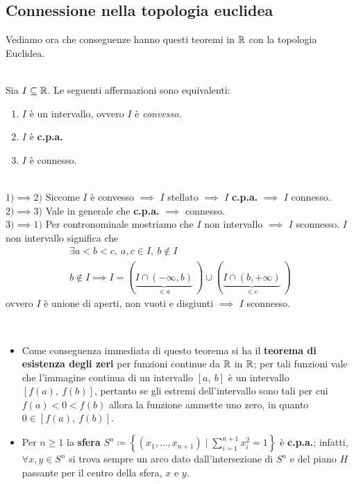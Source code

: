 \subsection{Connessione nella topologia euclidea}
Vediamo ora che conseguenze hanno questi teoremi in $\mathbb{R}$ con la topologia Euclidea.
\begin{theorema}~{}\\
	Sia $I\subseteq \mathbb{R}$. Le seguenti affermazioni sono equivalenti:
		\begin{enumerate}
	\item $I$ è un intervallo, ovvero $I$ è \textit{convesso}.
	\item $I$ è \textbf{c.p.a.}
	\item $I$ è connesso.
		\end{enumerate}
	\vspace{-3mm}
\end{theorema}
\begin{demonstration}~{}\\
	$1) \implies 2)$ Siccome $I$ è convesso $\implies$ $I$ stellato $\implies$ $I$ \textbf{c.p.a.} $\implies$ $I$ connesso. \\
	$2) \implies 3)$ Vale in generale che \textbf{c.p.a.} $\implies$ connesso.\\
	$3) \implies 1)$ Per contronominale mostriamo che $I$ non intervallo $\implies$ $I$ sconnesso. $I$ non intervallo significa che
		\begin{gather*}
			\exists a<b<c,\ a,c\in I,\ b\notin I \\
			b\notin I \implies I= \left(\underbrace{ I\cap \left(-\infty ,b\right)}_{\in a}\ \right) \cup \left( \underbrace{I\cap \left(b ,+\infty\right)}_{\in c}\ \right)
		\end{gather*}
	ovvero $I$ è unione di aperti, non vuoti e disgiunti $\implies$ $I$ sconnesso.	
\end{demonstration}
\begin{observe}~{}\label{teorema esistenza zeri funzioni continue, s^n cpa}
		\begin{itemize}
	\item Come conseguenza immediata di questo teorema si ha il \textbf{teorema di esistenza degli zeri} per funzioni continue da $\mathbb{R}$ in $\mathbb{R}$; per tali funzioni vale che l'immagine continua di un intervallo $\left[a,\ b\right]$ è un intervallo $\left[f\left(a\right),\ f\left(b\right)\right]$, pertanto se gli estremi dell'intervallo sono tali per cui $f\left(a\right)<0<f\left(b\right)$ allora la funzione ammette uno zero, in quanto $0\in\left[f\left(a\right),\ f\left(b\right)\right]$.
	\item Per $n\geq 1$ la \textbf{sfera} $\displaystyle S^n \coloneqq \left\{ \left(x_1,\ldots,x_{n+1}\right) \mid \sum_{i=1}^{n+1}x_i^2=1 \right\}$ è \textbf{c.p.a.}; infatti, $\forall x,y\in S^n$ si trova sempre un arco dato dall'intersezione di $S^n$ e del piano $H$ passante per il centro della sfera, $x$ e $y$.
		\end{itemize}
	\vspace{-3mm}
\end{observe}
